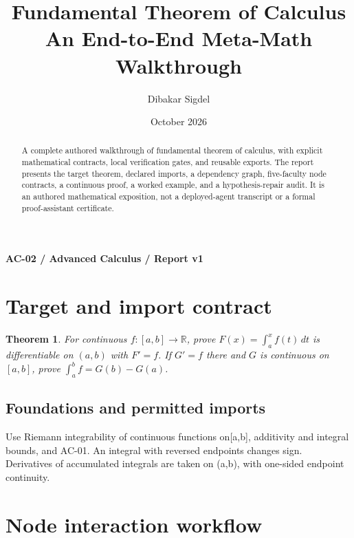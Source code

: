 \documentclass[preprint,12pt,aps,pra,showkeys,amsmath,amssymb,superscriptaddress,floatfix]{revtex4-2}
\newtheorem{theorem}{Theorem}[section]
\theoremstyle{definition}
\theoremstyle{remark}
\begin{document}
\title{Fundamental Theorem of Calculus\\[4pt]\large An End-to-End Meta-Math Walkthrough}

\author{Dibakar Sigdel}


\date{October 2026}

\begin{abstract}

A complete authored walkthrough of fundamental theorem of calculus, with
explicit mathematical contracts, local verification gates, and reusable
exports. The report presents the target theorem, declared imports, a
dependency graph, five-faculty node contracts, a continuous proof, a
worked example, and a hypothesis-repair audit. It is an authored
mathematical exposition, not a deployed-agent transcript or a formal
proof-assistant certificate.

\end{abstract}\maketitle\linespread{1.12}\selectfont

\noindent\textbf{AC-02 / Advanced Calculus / Report v1}

\section{Target and import contract}

\begin{theorem}

For continuous \(f:[a,b]\to\mathbb R\), prove \(F(x)=\int_a^x f(t)\,dt\)
is differentiable on \((a,b)\) with \(F'=f\). If \(G'=f\) there and
\(G\) is continuous on \([a,b]\), prove \(\int_a^b f=G(b)-G(a)\).

\end{theorem}

\subsection{Foundations and permitted imports}

Use Riemann integrability of continuous functions on{[}a,b{]},
additivity and integral bounds, and AC-01. An integral with reversed
endpoints changes sign. Derivatives of accumulated integrals are taken
on (a,b), with one-sided endpoint continuity.

\clearpage\section{Node interaction workflow}
\end{document}
